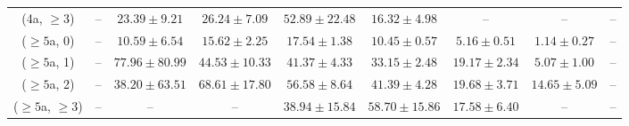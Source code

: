 \begin{table}[h!]
{\begin{tabular}{ccccccccc}
	(4a, $\ge3$) & -- & $23.39\pm 9.21$ & $26.24\pm 7.09$ & $52.89\pm 22.48$ & $16.32\pm 4.98$ & -- & -- & -- \\[0.5ex] 
	($\ge5$a, 0) & -- & $10.59\pm 6.54$ & $15.62\pm 2.25$ & $17.54\pm 1.38$ & $10.45\pm 0.57$ & $5.16\pm 0.51$ & $1.14\pm 0.27$ & -- \\[0.5ex] 
	($\ge5$a, 1) & -- & $77.96\pm 80.99$ & $44.53\pm 10.33$ & $41.37\pm 4.33$ & $33.15\pm 2.48$ & $19.17\pm 2.34$ & $5.07\pm 1.00$ & -- \\[0.5ex] 
	($\ge5$a, 2) & -- & $38.20\pm 63.51$ & $68.61\pm 17.80$ & $56.58\pm 8.64$ & $41.39\pm 4.28$ & $19.68\pm 3.71$ & $14.65\pm 5.09$ & -- \\[0.5ex] 
	($\ge5$a, $\ge3$) & -- & -- & -- & $38.94\pm 15.84$ & $58.70\pm 15.86$ & $17.58\pm 6.40$ & -- & -- \\[0.5ex] 
	\hline
	\hline
\end{tabular}}
\end{table}
